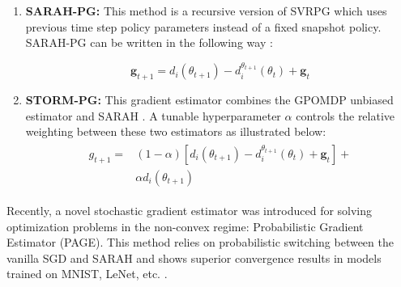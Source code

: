 \documentclass[10pt,twocolumn,letterpaper]{article}
\begin{document}
\begin{enumerate}
    
    \item \textbf{SARAH-PG:} This method is a recursive version of SVRPG which uses previous time step policy parameters instead of a fixed snapshot policy. SARAH-PG can be written in the following way \cite{RN3}:
    
    \begin{equation}
    \mathbf{g}_{t+1}=d_{i}\left(\theta_{t+1}\right)-d_{i}^{\theta_{t+1}}\left(\theta_{t}\right)+\mathbf{g}_{t}
    \end{equation}
    
    \item \textbf{STORM-PG:} This gradient estimator combines the GPOMDP unbiased estimator and SARAH \cite{stormpaper}. A tunable hyperparameter $\alpha$ controls the relative weighting between these two estimators as illustrated below:
    \begin{align} \label{eq: 8}
    \begin{split}
    {g}_{t+1}={}&
    (1-\alpha)\left[d_{i}\left(\theta_{t+1}\right)-d_{i}^{\theta_{t+1}}\left(\theta_{t}\right)+\mathbf{g}_{t}\right]+\\
    &\alpha d_{i}\left(\theta_{t+1}\right)
    \end{split}
    \end{align}
\end{enumerate}
Recently, a novel stochastic gradient estimator was introduced for solving optimization problems in the non-convex regime: Probabilistic Gradient Estimator (PAGE). This method relies on probabilistic switching between the vanilla SGD and SARAH and shows superior convergence results in models trained on MNIST, LeNet, etc. \cite{pagepaper}.
\end{document}
